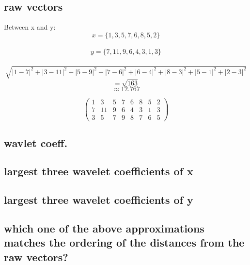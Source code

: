 \documentclass{article}
\begin{document}
\subsection{raw vectors}
Between x and y:
\[ x = \{1, 3, 5, 7, 6, 8, 5, 2\}  \] \\
\[ 	y = \{7, 11, 9, 6, 4, 3, 1, 3\}  \] \\

\[ \sqrt{ | 1-7 |^2 + |3 -11|^2 + |5-9|^2 + 
  |7-6|^2 + |6-4|^2 + |8-3|^2 + |5-1|^2 + |2-3|^2} \]
  \[ = \sqrt{163} \]
  \[ \approx 12.767 \]






  \[ 
	\begin{pmatrix}
	  1& 3& 5& 7& 6& 8& 5& 2 \\
	  7& 11& 9& 6& 4& 3& 1& 3  \\
	  3& 5& 7& 9& 8& 7& 6& 5 
	\end{pmatrix}
  \]


\subsection{wavlet coeff.}


\subsection{largest three wavelet coefficients of x}


\subsection{largest three wavelet coefficients of y}


\subsection{which one of the above approximations matches the ordering of the distances from 
the raw vectors?}
\end{document}

